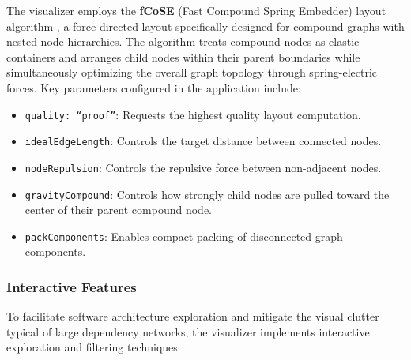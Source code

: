 The visualizer employs the \textbf{fCoSE} (Fast Compound Spring
Embedder) layout algorithm \cite{balci_fcose_2022}, a force-directed layout
specifically designed for compound graphs with nested node
hierarchies. The algorithm treats compound nodes as elastic
containers and arranges child nodes within their parent boundaries
while simultaneously optimizing the overall graph topology through
spring-electric forces. Key parameters configured in the application include:
\begin{itemize}
  \item \texttt{quality: ``proof''}: Requests the highest quality
    layout computation.
  \item \texttt{idealEdgeLength}: Controls the target distance
    between connected nodes.
  \item \texttt{nodeRepulsion}: Controls the repulsive force between
    non-adjacent nodes.
  \item \texttt{gravityCompound}: Controls how strongly child nodes
    are pulled toward the center of their parent compound node.
  \item \texttt{packComponents}: Enables compact packing of
    disconnected graph components.
\end{itemize}

\subsubsection{Interactive Features}

To facilitate software architecture exploration and mitigate the
visual clutter typical of large dependency networks, the visualizer
implements interactive exploration and filtering techniques
\cite{dielh_software_2007}:

